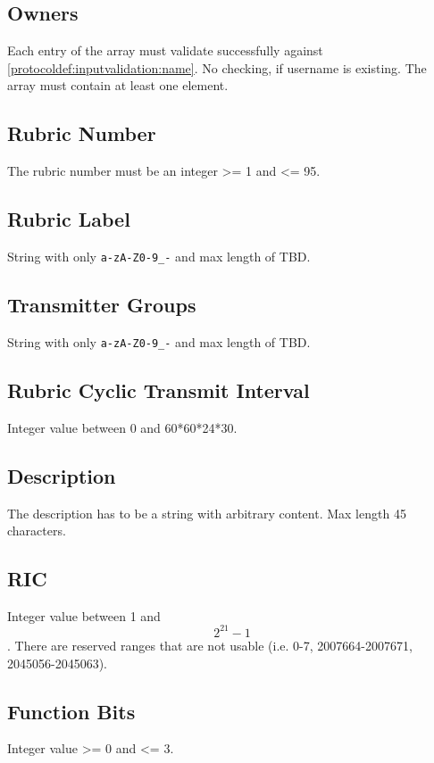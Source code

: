 \subsection{Owners}
\label{protocoldef:inputvalidation:owners}
Each entry of the array must validate successfully against \ref{protocoldef:inputvalidation:name}. No checking, if username is existing. The array must contain at least one element.

\subsection{Rubric Number}
\label{protocoldef:inputvalidation:rubricnumber}
The rubric number must be an integer >= 1 and <= 95.

\subsection{Rubric Label}
\label{protocoldef:inputvalidation:rubriclabel}
String with only \verb|a-zA-Z0-9_-| and max length of TBD.

\subsection{Transmitter Groups}
\label{protocoldef:inputvalidation:transmittergroup}
String with only \verb|a-zA-Z0-9_-| and max length of TBD.

\subsection{Rubric Cyclic Transmit Interval}
\label{protocoldef:inputvalidation:cyclictransmitinterval}
Integer value between 0 and 60*60*24*30.

\subsection{Description}
\label{protocoldef:inputvalidation:description}
The description has to be a string with arbitrary content. Max length 45 characters.

\subsection{RIC}
\label{protocoldef:inputvalidation:ric}
Integer value between 1 and $$2^21-1$$. There are reserved ranges that are not usable (i.e. 0-7, 2007664-2007671, 2045056-2045063).

\subsection{Function Bits}
\label{protocoldef:inputvalidation:function}
Integer value >= 0 and <= 3.

